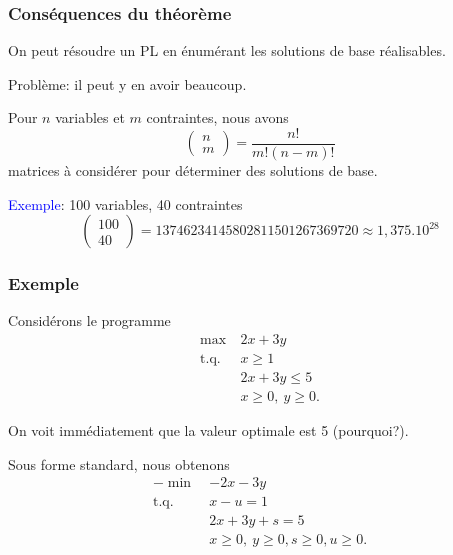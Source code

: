 \documentclass[usepdftitle=false]{beamer}
\begin{document}
\begin{frame}
\frametitle{Conséquences du théorème}

On peut résoudre un PL en énumérant les solutions de base réalisables.

Problème: il peut y en avoir beaucoup.

Pour $n$ variables et $m$ contraintes, nous avons
\[
\begin{pmatrix}
n \\ m
\end{pmatrix}
= \frac{n!}{m!(n-m)!}
\]
matrices à considérer pour déterminer des solutions de base.

\mbox{}

\textcolor{blue}{Exemple}: 100 variables, 40 contraintes
\[
\begin{pmatrix}
100 \\ 40
\end{pmatrix}
= 13746234145802811501267369720 \approx 1,375.10^{28}
\]

\end{frame}

\begin{frame}
\frametitle{Exemple}

Considérons le programme
\begin{align*}
\max\ & 2x + 3y \\
\mbox{t.q. } & x \geq 1 \\
& 2x + 3y \leq 5\\
& x \geq 0,\ y \geq 0.
\end{align*}

On voit immédiatement que la valeur optimale est 5 (pourquoi?).

\mbox{}

Sous forme standard, nous obtenons
\begin{align*}
- \min\ & -2x - 3y \\
\mbox{t.q. } & x - u = 1 \\
& 2x + 3y + s = 5\\
& x \geq 0,\ y \geq 0, s \geq 0, u \geq 0.
\end{align*}

\end{frame}
\end{document}
